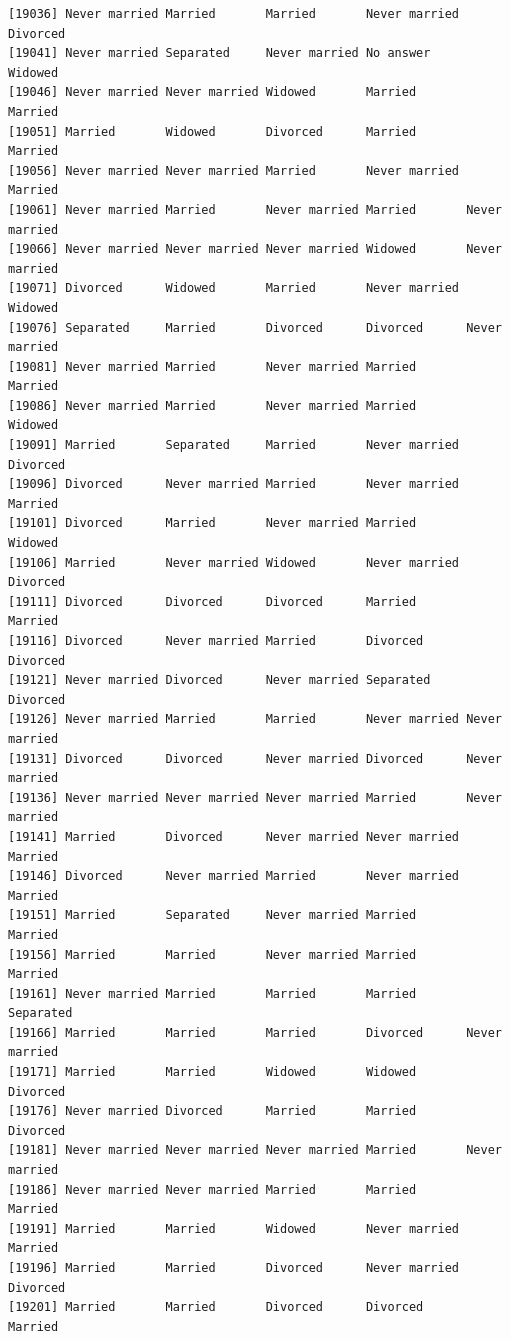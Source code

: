 \documentclass[
  letterpaper,
  DIV=11,
  numbers=noendperiod,
  oneside]{scrartcl}
\begin{document}
\begin{verbatim}
[19036] Never married Married       Married       Never married Divorced     
[19041] Never married Separated     Never married No answer     Widowed      
[19046] Never married Never married Widowed       Married       Married      
[19051] Married       Widowed       Divorced      Married       Married      
[19056] Never married Never married Married       Never married Married      
[19061] Never married Married       Never married Married       Never married
[19066] Never married Never married Never married Widowed       Never married
[19071] Divorced      Widowed       Married       Never married Widowed      
[19076] Separated     Married       Divorced      Divorced      Never married
[19081] Never married Married       Never married Married       Married      
[19086] Never married Married       Never married Married       Widowed      
[19091] Married       Separated     Married       Never married Divorced     
[19096] Divorced      Never married Married       Never married Married      
[19101] Divorced      Married       Never married Married       Widowed      
[19106] Married       Never married Widowed       Never married Divorced     
[19111] Divorced      Divorced      Divorced      Married       Married      
[19116] Divorced      Never married Married       Divorced      Divorced     
[19121] Never married Divorced      Never married Separated     Divorced     
[19126] Never married Married       Married       Never married Never married
[19131] Divorced      Divorced      Never married Divorced      Never married
[19136] Never married Never married Never married Married       Never married
[19141] Married       Divorced      Never married Never married Married      
[19146] Divorced      Never married Married       Never married Married      
[19151] Married       Separated     Never married Married       Married      
[19156] Married       Married       Never married Married       Married      
[19161] Never married Married       Married       Married       Separated    
[19166] Married       Married       Married       Divorced      Never married
[19171] Married       Married       Widowed       Widowed       Divorced     
[19176] Never married Divorced      Married       Married       Divorced     
[19181] Never married Never married Never married Married       Never married
[19186] Never married Never married Married       Married       Married      
[19191] Married       Married       Widowed       Never married Married      
[19196] Married       Married       Divorced      Never married Divorced     
[19201] Married       Married       Divorced      Divorced      Married      

\end{verbatim}
\end{document}

